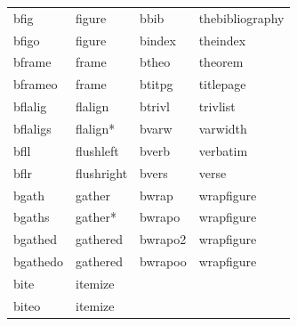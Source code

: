 \documentclass[11pt]{article}
\begin{document}
\begin{table}[!h]
\begin{tabular}{llll}
bfig      & figure      & bbib    & thebibliography \\
bfigo     & figure      & bindex  & theindex \\
bframe    & frame       & btheo   & theorem \\
bframeo   & frame       & btitpg  & titlepage \\
bflalig   & flalign     & btrivl  & trivlist \\
bflaligs  & flalign*    & bvarw   & varwidth \\
bfll      & flushleft   & bverb   & verbatim \\
bflr      & flushright  & bvers   & verse \\
bgath     & gather      & bwrap   & wrapfigure \\
bgaths    & gather*     & bwrapo  & wrapfigure \\
bgathed   & gathered    & bwrapo2 & wrapfigure \\
bgathedo  & gathered    & bwrapoo & wrapfigure \\
bite      & itemize     &         & \\
biteo     & itemize     &         & \\
\end{tabular}
\end{table}
\end{document}
